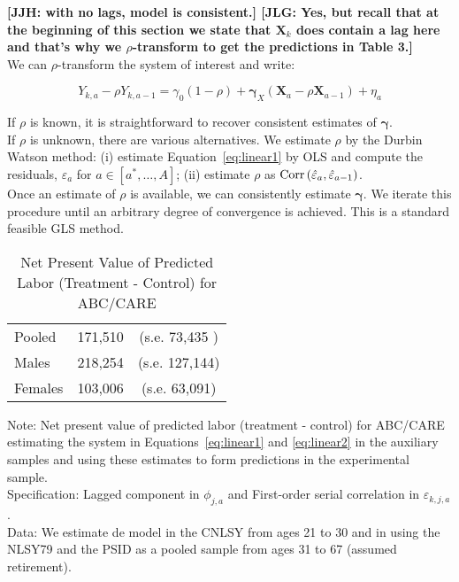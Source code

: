 \noindent \textbf{[JJH: with no lags, model is consistent.] [JLG: Yes, but recall that at the beginning of this section we state that $\bm{X}_{k}$ does contain a lag here and that's why we $\rho$-transform to get the predictions in Table 3.]}\\ 

\noindent We can $\rho$-transform the system of interest and write: 


\begin{equation}
Y_{k,a} - \rho Y_{k,a-1} = \gamma_{0} \left( 1 - \rho \right) + \bm{\gamma}_{X} \left( \bm{X}_{a} - \rho \bm{X}_{a-1} \right) + \eta_{a}
\end{equation}

\noindent If $\rho$ is known, it is straightforward to recover consistent estimates of $\bm{\gamma}$.\\

\noindent If $\rho$ is unknown, there are various alternatives. We estimate $\rho$ by the Durbin Watson method: (i) estimate Equation~\eqref{eq:linear1} by OLS and compute the residuals, $\varepsilon_{a}$ for $a \in [a^*, \ldots, A]$; (ii) estimate $\rho$ as  $\operatorname{Corr} \left( \hat{\varepsilon}_{a}, \hat{\varepsilon}_{a-1} \right)$.\\ 

\noindent Once an estimate of $\rho$ is available, we can consistently estimate $\bm{\gamma}$. We iterate this procedure until an arbitrary degree of convergence is achieved. This is a standard feasible GLS method.\\ 

\begin{table}[H] 
\begin{threeparttable}
\caption{Net Present Value of Predicted Labor (Treatment - Control) for ABC/CARE}
\label{table:yourlabel}
\centering 
\begin{tabular}{lcc} \toprule
Pooled & 171,510 & (s.e. 73,435 ) \\
Males & 218,254 & (s.e. 127,144) \\ 
Females & 103,006 & (s.e. 63,091) \\ \bottomrule
\end{tabular}
\end{threeparttable}
\end{table}
\begin{spacing}{1}
\begin{footnotesize}
\noindent Note: Net present value of predicted labor (treatment - control) for ABC/CARE estimating the system in Equations~\eqref{eq:linear1} and \eqref{eq:linear2} in the auxiliary samples and using these estimates to form predictions in the experimental sample.\\ 
\noindent Specification: Lagged component in $\phi_{j,a}$ and First-order serial correlation in $\varepsilon_{k,j,a}$.\\ 
\noindent Data: We estimate de model in the CNLSY from ages 21 to 30 and in using the NLSY79 and the PSID as a pooled sample from ages 31 to 67 (assumed retirement).\\ \\ 
\end{footnotesize}
\end{spacing}

